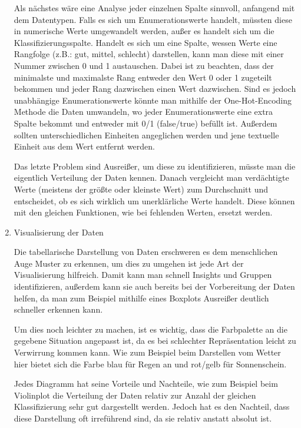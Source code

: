 \begin{enumerate}
          Als nächstes wäre eine Analyse jeder einzelnen Spalte sinnvoll, anfangend mit dem Datentypen. Falls es sich um Enumerationswerte handelt, müssten diese in numerische Werte umgewandelt werden, außer es handelt sich um die Klassifizierungsspalte. Handelt es sich um eine Spalte, wessen Werte eine Rangfolge  (z.B.: gut, mittel, schlecht) darstellen, kann man diese mit einer Nummer zwischen 0 und 1 austauschen. Dabei ist zu beachten, dass der minimalste und maximalste Rang entweder den Wert 0 oder 1 zugeteilt bekommen und jeder Rang dazwischen einen Wert dazwischen. Sind es jedoch unabhängige Enumerationswerte könnte man mithilfe der One-Hot-Encoding Methode die Daten umwandeln, wo jeder Enumerationswerte eine extra Spalte bekommt und entweder mit 0/1 (false/true) befüllt ist. Außerdem sollten unterschiedlichen Einheiten angeglichen werden und jene textuelle Einheit aus dem Wert entfernt werden.

          Das letzte Problem sind Ausreißer, um diese zu identifizieren, müsste man die eigentlich Verteilung der Daten kennen. Danach vergleicht man verdächtigte Werte (meistens der größte oder kleinste Wert) zum Durchschnitt und entscheidet, ob es sich wirklich um unerklärliche Werte handelt. Diese können mit den gleichen Funktionen, wie bei fehlenden Werten, ersetzt werden.

    \item Visualisierung der Daten

          Die tabellarische Darstellung von Daten erschweren es dem menschlichen Auge Muster zu erkennen, um dies zu umgehen ist jede Art der Visualisierung hilfreich. Damit kann man schnell Insights und Gruppen identifizieren, außerdem kann sie auch bereits bei der Vorbereitung der Daten helfen, da man zum Beispiel mithilfe eines Boxplots Ausreißer deutlich schneller erkennen kann.

          Um dies noch leichter zu machen, ist es wichtig, dass die Farbpalette an die gegebene Situation angepasst ist, da es bei schlechter Repräsentation leicht zu Verwirrung kommen kann. Wie zum Beispiel beim Darstellen vom Wetter hier bietet sich die Farbe blau für Regen an und rot/gelb für Sonnenschein.

          Jedes Diagramm hat seine Vorteile und Nachteile, wie zum Beispiel beim Violinplot die Verteilung der Daten relativ zur Anzahl der gleichen Klassifizierung sehr gut dargestellt werden. Jedoch hat es den Nachteil, dass diese Darstellung oft irreführend sind, da sie relativ anstatt absolut ist.


\end{enumerate}
